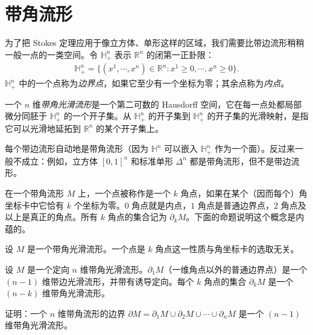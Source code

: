 \documentclass[../../main.tex]{subfiles}
\begin{document}
\section{带角流形}\label{section:ch16-manifolds-with-corners}

为了把 Stokes 定理应用于像立方体、单形这样的区域，我们需要比带边流形稍稍一般一点的一类空间。令 $\mathbb{H}^n_+$ 表示 $\mathbb{R}^n$ 的闭第一正卦限：
\begin{align*}
\mathbb{H}^n_+=\{(x^1,\cdots ,x^n)\in\mathbb{R}^n:x^1\geqslant0,\cdots ,x^n\geqslant0\}.
\end{align*}
$\mathbb{H}^n_+$ 中的一个点称为\emph{边界点}，如果它至少有一个坐标为零；其余点称为\emph{内点}。

\begin{definition}[带角流形]
一个 $n$ 维\emph{带角光滑流形}是一个第二可数的 Hausdorff 空间，它在每一点处都局部微分同胚于 $\mathbb{H}^n_+$ 的一个开子集。从 $\mathbb{H}^n_+$ 的开子集到 $\mathbb{H}^n_+$ 的开子集的光滑映射，是指它可以光滑地延拓到 $\mathbb{R}^n$ 的某个开子集上。
\end{definition}

每个带边流形自动地是带角流形（因为 $\mathbb{H}^n$ 可以嵌入 $\mathbb{H}^n_+$ 作为一个面）。反过来一般不成立：例如，立方体 $[0,1]^n$ 和标准单形 $\Delta^n$ 都是带角流形，但不是带边流形。

在一个带角流形 $M$ 上，一个点被称作是一个 $k$ 角点，如果在某个（因而每个）角坐标卡中它恰有 $k$ 个坐标为零。$0$ 角点就是内点，$1$ 角点是普通边界点，$2$ 角点及以上是真正的角点。所有 $k$ 角点的集合记为 $\partial_k M$。下面的命题说明这个概念是内蕴的。

\begin{proposition}[角点的不变性]\label{proposition:ch16-invariance-of-corner-points}
设 $M$ 是一个带角光滑流形。一个点是 $k$ 角点这一性质与角坐标卡的选取无关。
\end{proposition}

\begin{proposition}\label{proposition:ch16-corner-parametrization}
设 $M$ 是一个定向 $n$ 维带角光滑流形。$\partial_1 M$（一维角点以外的普通边界点）是一个 $(n-1)$ 维带边光滑流形，并带有诱导定向。每个 $k$ 角点的集合 $\partial_k M$ 是一个 $(n-k)$ 维带角光滑流形。
\end{proposition}

\begin{exercise}\label{exercise:ch16-22}
证明：一个 $n$ 维带角流形的边界 $\partial M=\partial_1 M\cup\partial_2 M\cup\cdots\cup\partial_n M$ 是一个 $(n-1)$ 维带角光滑流形。
\end{exercise}
\end{document}
